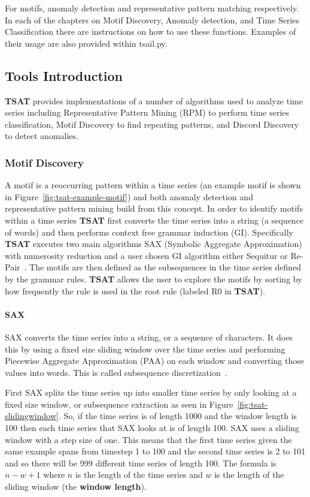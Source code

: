 \documentclass[titlepage, letterpaper, 12pt]{article}
\newcommand\TSAT{\textbf{TSAT}}
\begin{document}
For motifs, anomaly detection and representative pattern matching respectively.  In each of the chapters on Motif Discovery, Anomaly detection, and Time Series Classification there are instructions on how to use these functions.  Examples of their usage are also provided within tsail.py.

\subsection{Tools Introduction}
\label{tools}
{\TSAT} provides implementations of a number of algorithms used to analyze time series including Representative Pattern Mining (RPM) to perform time series classification, Motif Discovery to find repeating patterns, and Discord Discovery to detect anomalies.


\subsubsection{Motif Discovery}
\label{MotifSec}
A motif is a reoccurring pattern within a time series (an example motif is shown in Figure~\ref{fig:tsat-example-motif}) and both anomaly detection and representative pattern mining build from this concept.  In order to identify motifs within a time series {\TSAT} first converts the time series into a string (a sequence of words) and then performs context free grammar induction (GI).  Specifically {\TSAT} executes two main algorithms SAX (Symbolic Aggregate Approximation) with numerosity reduction and a user chosen GI algorithm either Sequitur or Re-Pair~\cite{senin-gv2,nevill1997identifying,larsson2000off}.  The motifs are then defined as the subsequences in the time series defined by the grammar rules.  {\TSAT} allows the user to explore the motifs by sorting by how frequently the rule is used in the root rule (labeled R0 in {\TSAT}).

\paragraph{SAX}SAX converts the time series into a string, or a sequence of characters.  It does this by using a fixed size sliding window over the time series and performing Piecewise Aggregate Approximation (PAA) on each window and converting those values into words.  This is called subsequence discretization~\cite{lonardi2002finding}.

First SAX splits the time series up into smaller time series by only looking at a fixed size window, or subsequence extraction as seen in Figure~\ref{fig:tsat-slidingwindow}.  So, if the time series is of length 1000 and the window length is 100 then each time series that SAX looks at is of length 100.  SAX uses a sliding window with a step size of one.  This means that the first time series given the same example spans from timestep 1 to 100 and the second time series is 2 to 101 and so there will be 999 different time series of length 100.  The formula is \(n - w + 1\) where \(n\) is the length of the time series and \(w\) is the length of the sliding window (the \textbf{window length}).
\end{document}
